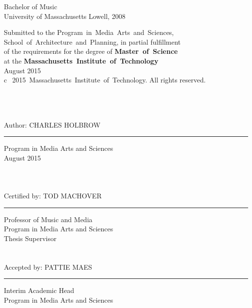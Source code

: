 
\noindent Bachelor of Music\\
\noindent University of Massachusetts Lowell, 2008\\

\vspace{30mm}

\begin{raggedright}
\noindent Submitted to the Program~in~Media~Arts~and~Sciences,\\
School~of~Architecture~and~Planning, in partial fulfillment\\
of the requirements for the degree of \textbf{Master~of~Science}\\
at the \textbf{Massachusetts~Institute~of~Technology} \\
\noindent August 2015\\
\noindent \textcircled{c}~2015~Massachusetts~Institute~of~Technology. All rights reserved. \\
\end{raggedright}

\begin{fullwidth}
\mbox{ }\\
\mbox{ }\\
\mbox{ }\\


\noindent Author: \hfill CHARLES HOLBROW\vspace{3pt}\hrule\vspace{6pt}
\flushright Program in Media Arts and Sciences\\
 August 2015 \\
\mbox{ }\\
\mbox{ }\\
\mbox{ }\\
 
\noindent Certified by: \hfill TOD MACHOVER\vspace{3pt}\hrule\vspace{6pt}
Professor of Music and Media\\
Program in Media Arts and Sciences\\
Thesis Supervisor\\
\mbox{ }\\ 
\mbox{ }\\

\noindent Accepted by: \hfill PATTIE MAES\vspace{3pt}\hrule\vspace{6pt}
Interim Academic Head\\
Program in Media Arts and Sciences\\

\thispagestyle{empty}  %
\end{fullwidth}
 
